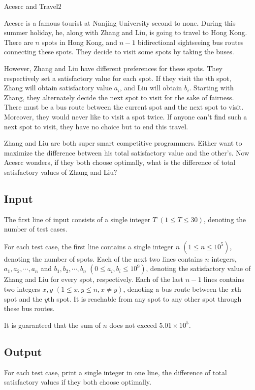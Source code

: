 \begin{Problem}{Acesrc and Travel}{2}

Acesrc is a famous tourist at Nanjing University second to none. During this summer holiday, he, along with Zhang and Liu, is going to travel to Hong Kong. There are $n$ spots in Hong Kong, and $n - 1$ bidirectional sightseeing bus routes connecting these spots. They decide to visit some spots by taking the buses.

However, Zhang and Liu have different preferences for these spots. They respectively set a satisfactory value for each spot. If they visit the $i$th spot, Zhang will obtain satisfactory value $a_i$, and Liu will obtain $b_i$. Starting with Zhang, they alternately decide the next spot to visit for the sake of fairness. There must be a bus route between the current spot and the next spot to visit. Moreover, they would never like to visit a spot twice. If anyone can't find such a next spot to visit, they have no choice but to end this travel.

Zhang and Liu are both super smart competitive programmers. Either want to maximize the difference between his total satisfactory value and the other's. Now Acesrc wonders, if they both choose optimally, what is the difference of total satisfactory values of Zhang and Liu?

\subsection*{Input}

The first line of input consists of a single integer $T$ $(1 \leq T \leq 30)$, denoting the number of test cases.

For each test case, the first line contains a single integer $n$ $(1 \leq n \leq 10^5)$, denoting the number of spots. Each of the next two lines contains $n$ integers, $a_1, a_2, \cdots, a_n$ and $b_1, b_2, \cdots, b_n$ $(0 \leq a_i, b_i \leq 10^9)$, denoting the 
satisfactory value of Zhang and Liu for every spot, respectively. Each of the last $n - 1$ lines contains two integers $x, y$ $(1 \leq x, y \leq n, x \neq y)$, denoting a bus route between the $x$th spot and the $y$th spot. It is reachable from any spot to any other spot through these bus routes.

It is guaranteed that the sum of $n$ does not exceed $5.01 \times 10^5$.

\subsection*{Output}

For each test case, print a single integer in one line, the difference of total satisfactory values if they both choose optimally.


\end{Problem}
